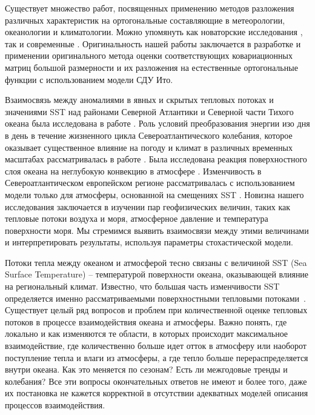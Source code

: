 Существует множество работ, посвященных применению методов разложения различных характеристик на ортогональные составляющие в метеорологии, океанологии и климатологии. Можно упомянуть как новаторские исследования \cite{lorenz1956empirical, bagrov1959analytic,Obukhov1960,Yudin1968}, так и современные \cite{kobayashi2015jra}. Оригинальность нашей работы заключается в разработке и применении оригинального метода оценки соответствующих ковариационных матриц большой размерности и их разложения на естественные ортогональные функции с использованием модели СДУ Ито.

Взаимосвязь между аномалиями в явных и скрытых тепловых потоках и значениями SST над районами Северной Атлантики и Северной части Тихого океана была исследована в работе  \cite{cayan1992latent}. Роль условий преобразования энергии изо дня в день в течение жизненного цикла Североатлантического колебания, которое оказывает существенное влияние на погоду и климат в различных временных масштабах рассматривалась в работе  \cite{kim2024phase}. Была исследована реакция поверхностного слоя океана на неглубокую конвекцию в атмосфере \cite{brilouet2024numerical}. Изменчивость в Североатлантическом европейском регионе рассматривалась с использованием модели только для атмосферы, основанной на смещениях SST \cite{keeley2012impact}. Новизна нашего исследования заключается в изучении пар геофизических величин, таких как тепловые потоки воздуха и моря, атмосферное давление и температура поверхности моря. Мы стремимся выявить взаимосвязи между этими величинами и интерпретировать результаты, используя параметры стохастической модели.


Потоки тепла между океаном и атмосферой тесно связаны с величиной SST (Sea Surface Temperature) -- температурой поверхности океана, оказывающей влияние на региональный климат. Известно, что большая часть изменчивости SST определяется именно рассматриваемыми поверхностными тепловыми потоками~\cite{schneider2015atmospheric,hausmann2017mechanisms,li2019decadal,blein2022parametrizing}. Существует целый ряд вопросов и проблем при количественной оценке тепловых потоков в процессе взаимодействия океана и атмосферы. Важно понять, где локально и как изменяются те области, в которых происходит максимальное взаимодействие, где количественно больше идет отток в атмосферу или наоборот поступление тепла и влаги из атмосферы, а где тепло больше перераспределяется внутри океана. Как это меняется по сезонам? Есть ли межгодовые тренды и колебания? Все эти вопросы окончательных ответов не имеют и более того, даже их постановка не кажется корректной в отсутствии адекватных моделей описания процессов взаимодействия.

